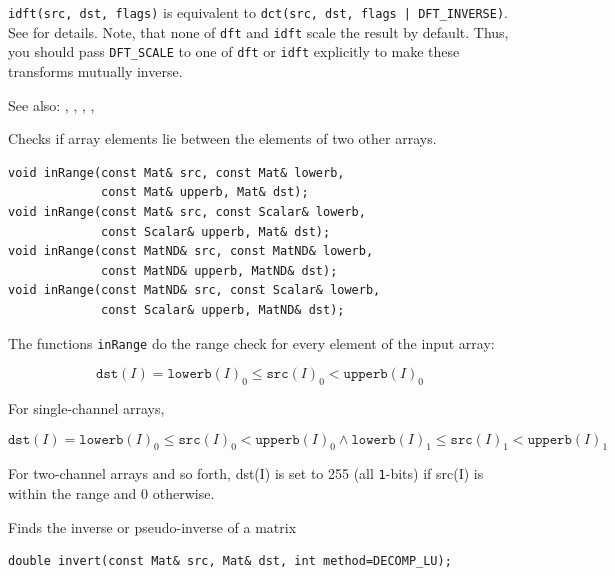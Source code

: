 \texttt{idft(src, dst, flags)} is equivalent to \texttt{dct(src, dst, flags | DFT\_INVERSE)}.
See  for details.
Note, that none of \texttt{dft} and \texttt{idft} scale the result by default.
Thus, you should pass \texttt{DFT\_SCALE} to one of \texttt{dft} or \texttt{idft}
explicitly to make these transforms mutually inverse.

See also: , , , , 


\label{inRange}
Checks if array elements lie between the elements of two other arrays.

\begin{lstlisting}
void inRange(const Mat& src, const Mat& lowerb,
             const Mat& upperb, Mat& dst);
void inRange(const Mat& src, const Scalar& lowerb,
             const Scalar& upperb, Mat& dst);
void inRange(const MatND& src, const MatND& lowerb,
             const MatND& upperb, MatND& dst);
void inRange(const MatND& src, const Scalar& lowerb,
             const Scalar& upperb, MatND& dst);
\end{lstlisting}
\begin{description}
\end{description}

The functions \texttt{inRange} do the range check for every element of the input array:

\[
\texttt{dst}(I)=\texttt{lowerb}(I)_0 \leq \texttt{src}(I)_0 < \texttt{upperb}(I)_0
\]

For single-channel arrays,

\[
\texttt{dst}(I)=
\texttt{lowerb}(I)_0 \leq \texttt{src}(I)_0 < \texttt{upperb}(I)_0 \land
\texttt{lowerb}(I)_1 \leq \texttt{src}(I)_1 < \texttt{upperb}(I)_1
\]

For two-channel arrays and so forth,
dst(I) is set to 255 (all \texttt{1}-bits) if src(I) is within the range and 0 otherwise.


\label{invert}
Finds the inverse or pseudo-inverse of a matrix

\begin{lstlisting}
double invert(const Mat& src, Mat& dst, int method=DECOMP_LU);
\end{lstlisting}
\begin{description}
\end{description}

